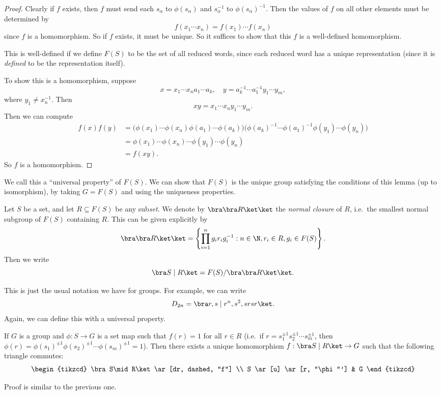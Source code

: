 \documentclass[a4paper]{article}
\begin{document}
\begin{proof}
  Clearly if $f$ exists, then $f$ must send each $s_\alpha$ to $\phi(s_\alpha)$ and $s_\alpha^{-1}$ to $\phi(s_\alpha)^{-1}$. Then the values of $f$ on all other elements must be determined by
  \[
    f(x_1\cdots x_n) = f(x_1)\cdots f(x_n)
  \]
  since $f$ is a homomorphism. So if $f$ exists, it must be unique. So it suffices to show that this $f$ is a well-defined homomorphism.

  This is well-defined if we define $F(S)$ to be the set of all reduced words, since each reduced word has a unique representation (since it is \emph{defined} to be the representation itself).

  To show this is a homomorphism, suppose
  \[
    x = x_1\cdots x_n a_1\cdots a_k,\quad y = a_k^{-1} \cdots a_1^{-1} y_1\cdots y_m,
  \]
  where $y_1 \not= x_n^{-1}$. Then
  \[
    xy = x_1 \cdots x_n y_1\cdots y_m.
  \]
  Then we can compute
  \begin{align*}
    f(x)f(y) &= \big(\phi(x_1)\cdots \phi(x_n) \phi(a_1) \cdots \phi(a_k)\big) \big(\phi(a_k)^{-1} \cdots \phi(a_1)^{-1}\phi(y_1)\cdots\phi(y_n)\big) \\
    &= \phi(x_1)\cdots\phi(x_n) \cdots \phi(y_1)\cdots \phi(y_n) \\
    &= f(xy).
  \end{align*}
  So $f$ is a homomorphism.
\end{proof}
We call this a ``universal property'' of $F(S)$. We can show that $F(S)$ is the unique group satisfying the conditions of this lemma (up to isomorphism), by taking $G = F(S)$ and using the uniqueness properties.

\begin{defi}
  Let $S$ be a set, and let $R \subseteq F(S)$ be any sub\emph{set}. We denote by $\bra \bra R\ket\ket$ the \emph{normal closure} of $R$, i.e.\ the smallest normal subgroup of $F(S)$ containing $R$. This can be given explicitly by
  \[
    \bra \bra R\ket \ket = \left\{\prod_{i = 1}^n g_i r_i g_i^{-1}: n \in \N, r_i \in R, g_i \in F(S)\right\}.
  \]
  Then we write
  \[
    \bra S \mid R\ket = F(S)/\bra\bra R\ket\ket.
  \]
\end{defi}
This is just the usual notation we have for groups. For example, we can write
\[
  D_{2n} = \bra r, s \mid r^n, s^2, srsr\ket.
\]
Again, we can define this with a universal property.
\begin{lemma}
  If $G$ is a group and $\phi: S \to G$ is a set map such that $f(r) = 1$ for all $r \in R$ (i.e.\ if $r = s_1^{\pm 1}s_2^{\pm 1}\cdots s_m^{\pm 1}$, then $\phi(r) = \phi(s_1)^{\pm 1}\phi(s_2)^{\pm 1} \cdots \phi(s_m)^{\pm 1} = 1$). Then there exists a unique homomorphism $f: \bra S \mid R\ket \to G$ such that the following triangle commutes:
  \[
    \begin{tikzcd}
      \bra S\mid R\ket \ar[dr, dashed, "f"] \\
      S \ar[u] \ar[r, "\phi"'] & G
    \end{tikzcd}
  \]
\end{lemma}
Proof is similar to the previous one.
\end{document}
